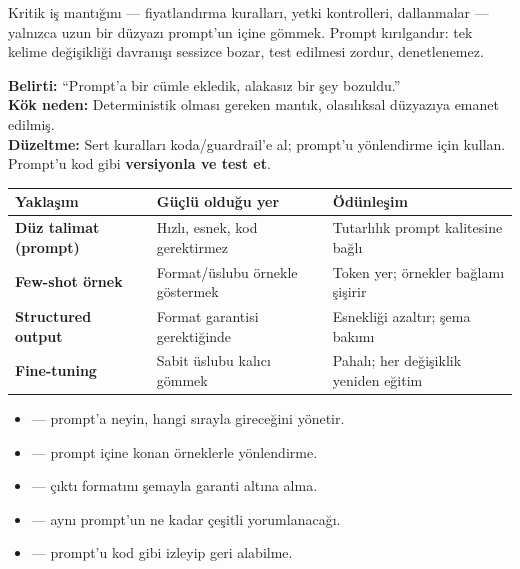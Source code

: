 \begin{antibox}
Kritik iş mantığını --- fiyatlandırma kuralları, yetki kontrolleri, dallanmalar ---
yalnızca uzun bir düzyazı prompt'un içine gömmek. Prompt kırılgandır: tek kelime
değişikliği davranışı sessizce bozar, test edilmesi zordur, denetlenemez.

\smallskip
\textbf{Belirti:} ``Prompt'a bir cümle ekledik, alakasız bir şey bozuldu.''\\
\textbf{Kök neden:} Deterministik olması gereken mantık, olasılıksal düzyazıya emanet edilmiş.\\
\textbf{Düzeltme:} Sert kuralları koda/guardrail'e al; prompt'u yönlendirme için kullan. Prompt'u kod gibi \textbf{versiyonla ve test et}.
\end{antibox}

\vspace{2pt}
\begin{tabularx}{\linewidth}{@{}>{\raggedright\arraybackslash}p{30mm} L L@{}}
\toprule
{\sffamily\bfseries\small Yaklaşım} &
{\sffamily\bfseries\small Güçlü olduğu yer} &
{\sffamily\bfseries\small Ödünleşim} \\
\midrule
\textbf{Düz talimat (prompt)} & Hızlı, esnek, kod gerektirmez &
Tutarlılık prompt kalitesine bağlı \\
\addlinespace[3pt]
\textbf{Few-shot örnek} & Format/üslubu örnekle göstermek &
Token yer; örnekler bağlamı şişirir \\
\addlinespace[3pt]
\textbf{Structured output} & Format garantisi gerektiğinde &
Esnekliği azaltır; şema bakımı \\
\addlinespace[3pt]
\textbf{Fine-tuning} & Sabit üslubu kalıcı gömmek &
Pahalı; her değişiklik yeniden eğitim \\
\bottomrule
\end{tabularx}

\begin{itemize}
  \item {} --- prompt'a neyin, hangi sırayla gireceğini yönetir.
  \item {} --- prompt içine konan örneklerle yönlendirme.
  \item {} --- çıktı formatını şemayla garanti altına alma.
  \item {} --- aynı prompt'un ne kadar çeşitli yorumlanacağı.
  \item {} --- prompt'u kod gibi izleyip geri alabilme.
\end{itemize}

